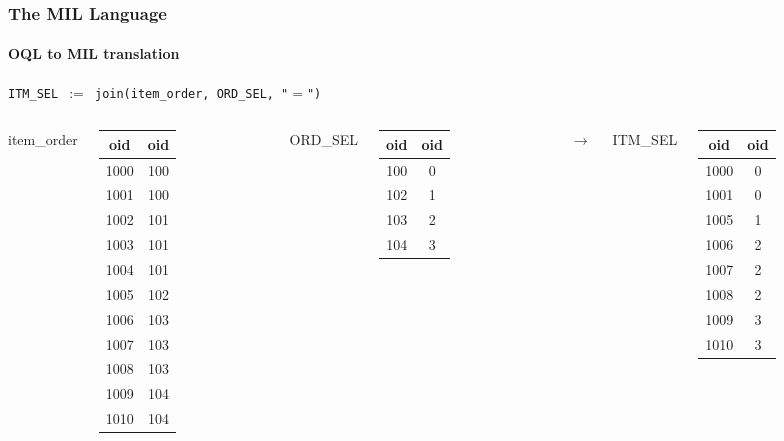 \documentclass{beamer}
\begin{document}
\begin{frame}
  \frametitle{The MIL Language}
  \framesubtitle{OQL to MIL translation}

  \begin{block}{}
  {\tt ITM\_SEL $:=$ join(item\_order, ORD\_SEL, "$=$")}
  \end{block}

  \begin{columns}

  \column{2cm}

  item\_order
  \begin{tabular}{|c|c|}
    \hline
    oid & oid \\
    \hline
    1000 & 100 \\
    1001 & 100 \\
    1002 & 101 \\
    1003 & 101 \\
    1004 & 101 \\
    1005 & 102 \\
    1006 & 103 \\
    1007 & 103 \\
    1008 & 103 \\
    1009 & 104 \\
    1010 & 104 \\
    \hline
  \end{tabular}

  \column{1.5cm}

  ORD\_SEL
  \begin{tabular}{|c|c|}
    \hline
    oid & oid \\
    \hline
    100 & 0 \\
    102 & 1 \\
    103 & 2 \\
    104 & 3 \\
    \hline
  \end{tabular}

  \column{0.5cm}

  $\longrightarrow$

  \column{1cm}

  ITM\_SEL
  \begin{tabular}{|c|c|}
    \hline
    oid & oid \\
    \hline
    1000 & 0 \\
    1001 & 0 \\
    1005 & 1 \\
    1006 & 2 \\
    1007 & 2 \\
    1008 & 2 \\
    1009 & 3 \\
    1010 & 3 \\
    \hline
  \end{tabular}

  \end{columns}

\end{frame}
\end{document}
